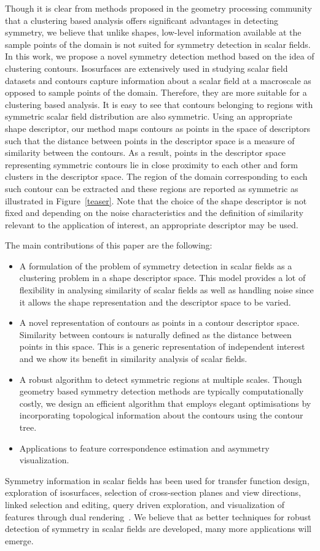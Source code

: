 \documentclass[review,journal]{vgtc}         %
\begin{document}
Though it is clear from methods proposed in the geometry processing community
that a clustering based analysis offers significant advantages in detecting symmetry,
we believe that unlike shapes, low-level information available at the sample points of the 
domain is not suited for symmetry detection in scalar fields. In this work, we propose 
a novel symmetry detection method based on the idea of clustering contours. Isosurfaces
are extensively used in studying scalar field datasets and contours capture information 
about a scalar field at a macroscale as opposed to sample points of the domain. Therefore, they
are more suitable for a clustering based analysis. It is easy to see that contours
belonging to regions with symmetric scalar field distribution are also symmetric. Using an 
appropriate shape descriptor, our method maps contours as points in the space of descriptors 
such that the distance between points in the descriptor space is a measure of similarity 
between the contours. As a result, points in the descriptor space 
representing symmetric contours lie in close 
proximity to each other and form clusters in the descriptor space. The region of the domain
corresponding to each such contour can be extracted and these regions
are reported as symmetric as illustrated in Figure~\ref{teaser}. Note that the choice
of the shape descriptor is not fixed and depending on the noise characteristics and the definition
of similarity relevant to the application of interest, an appropriate descriptor may be used.

The main contributions of this paper are the following:
\begin{itemize}
\item A formulation of the problem of symmetry detection in scalar fields
as a clustering problem in a shape descriptor space. This model
provides a lot of flexibility in analysing similarity of scalar fields
as well as handling noise since it allows the shape representation and the 
descriptor space to be varied.
\item A novel representation of contours as points in a contour descriptor space.
Similarity between contours is naturally defined as the distance between points 
in this space. This is a generic representation of independent interest 
and we show its benefit in similarity analysis of scalar fields.
\item A robust algorithm to detect symmetric regions at multiple scales. Though geometry based 
symmetry detection methods are typically computationally costly, we design an efficient algorithm 
that employs elegant optimisations by incorporating topological information 
about the contours using the contour tree.
\item Applications to feature correspondence estimation and asymmetry visualization.
\end{itemize}
Symmetry information in scalar fields
has been used for transfer function design, exploration of isosurfaces, selection of cross-section
planes and view directions, linked selection and editing, query driven exploration,
and visualization of features through dual rendering~\cite{ThomN11,HongS08,ThomN13,MasoodTN13}.
We believe that as better techniques for robust detection of symmetry in scalar fields are developed,
many more applications will emerge.
\end{document}

